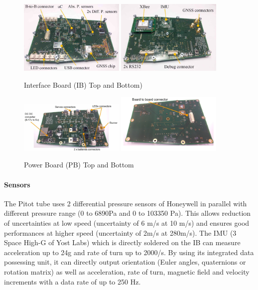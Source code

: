  \begin{figure}[h!]
 	\centering
        \includegraphics[width=0.45\textwidth]{img/AV_FIG_IB_top.jpg}
          \includegraphics[width=0.45\textwidth]{img/AV_FIG_IB_bottom.jpg}
        \caption{Interface Board (IB) Top and Bottom)}
        \label{f:avionics_ib}
 \end{figure}
 
  \begin{figure}[h!]
 	\centering
        \includegraphics[width=0.45\textwidth]{img/AV_FIG_PB_top.jpg}
          \includegraphics[width=0.45\textwidth]{img/AV_FIG_PB_bottom.jpg}
        \caption{Power Board (PB) Top and Bottom}
        \label{f:avionics_pb}
 \end{figure}

\paragraph{Sensors}
 \hfill \break
The Pitot tube uses 2 differential pressure sensors of Honeywell in parallel with different pressure range (0 to 6890Pa and 0 to 103350 Pa). This allows reduction of uncertainties at low speed (uncertainty of 6 m/s at 10 m/s) and ensures good performances at higher speed (uncertainty of 2m/s at 280m/s).
The IMU (3 Space High-G of Yost Labs) which is directly soldered on the IB can measure acceleration up to 24g and rate of turn up to 2000/s.
By using its integrated data possessing unit, it can directly output orientation (Euler angles, quaternions or rotation matrix) as well as acceleration, rate of turn, magnetic field and velocity increments with a data rate of up to 250 Hz.

